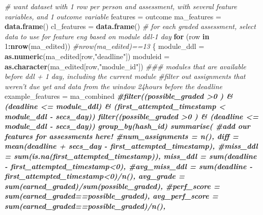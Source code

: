 \documentclass[
]{article}
\newenvironment{Shaded}{\begin{snugshade}}{\end{snugshade}}
\newcommand{\CommentTok}[1]{\textcolor[rgb]{0.56,0.35,0.01}{\textit{#1}}}
\newcommand{\ControlFlowTok}[1]{\textcolor[rgb]{0.13,0.29,0.53}{\textbf{#1}}}
\newcommand{\DataTypeTok}[1]{\textcolor[rgb]{0.13,0.29,0.53}{#1}}
\newcommand{\DecValTok}[1]{\textcolor[rgb]{0.00,0.00,0.81}{#1}}
\newcommand{\KeywordTok}[1]{\textcolor[rgb]{0.13,0.29,0.53}{\textbf{#1}}}
\newcommand{\NormalTok}[1]{#1}
\newcommand{\OperatorTok}[1]{\textcolor[rgb]{0.81,0.36,0.00}{\textbf{#1}}}
\newcommand{\StringTok}[1]{\textcolor[rgb]{0.31,0.60,0.02}{#1}}
\begin{document}
\begin{Shaded}
\begin{Highlighting}[]
\CommentTok{# want dataset with 1 row per person and assessment, with several feature variables, and 1 outcome variable}
\NormalTok{features =}\StringTok{ }\NormalTok{outcome}
\NormalTok{ma_features =}\StringTok{ }\KeywordTok{data.frame}\NormalTok{()}
\NormalTok{cl_features =}\StringTok{ }\KeywordTok{data.frame}\NormalTok{()}
\CommentTok{# for each graded assessment, select data to use for feature eng based on module ddl-1 day}
\ControlFlowTok{for}\NormalTok{ (row }\ControlFlowTok{in} \DecValTok{1}\OperatorTok{:}\KeywordTok{nrow}\NormalTok{(ma_edited)) }\CommentTok{#nrow(ma_edited)==13}
\NormalTok{\{}
\NormalTok{  module_ddl =}\StringTok{ }\KeywordTok{as.numeric}\NormalTok{(ma_edited[row,}\StringTok{"deadline"}\NormalTok{])}
\NormalTok{  moduleid =}\StringTok{ }\KeywordTok{as.character}\NormalTok{(ma_edited[row,}\StringTok{"module_id"}\NormalTok{])}
  \CommentTok{### modules that are available before ddl + 1 day, including the current module}
  \CommentTok{#filter out assignments that weren't due yet and data from the window 24hours before the deadline}
\NormalTok{  example_features =}\StringTok{ }\NormalTok{ma_combined }\OperatorTok{%>%}\StringTok{ }
\StringTok{    }\CommentTok{#filter((possible_graded >0 ) & (deadline <= module_ddl) & (first_attempted_timestamp < module_ddl - secs_day)) %>%}
\StringTok{    }\KeywordTok{filter}\NormalTok{((possible_graded }\OperatorTok{>}\DecValTok{0}\NormalTok{ ) }\OperatorTok{&}\StringTok{ }\NormalTok{(deadline }\OperatorTok{<=}\StringTok{ }\NormalTok{module_ddl }\OperatorTok{-}\StringTok{ }\NormalTok{secs_day)) }\OperatorTok{%>%}
\StringTok{    }\KeywordTok{group_by}\NormalTok{(hash_id) }\OperatorTok{%>%}
\StringTok{    }\KeywordTok{summarise}\NormalTok{(}
        \CommentTok{#add our features for assessments here!}
        \CommentTok{#num_assignments = n(),}
        \DataTypeTok{diff =} \KeywordTok{mean}\NormalTok{(deadline }\OperatorTok{+}\StringTok{ }\NormalTok{secs_day }\OperatorTok{-}\StringTok{ }\NormalTok{first_attempted_timestamp),}
        \CommentTok{#miss_ddl = sum(is.na(first_attempted_timestamp)),}
        \DataTypeTok{miss_ddl =} \KeywordTok{sum}\NormalTok{(deadline }\OperatorTok{-}\StringTok{ }\NormalTok{first_attempted_timestamp}\OperatorTok{<}\DecValTok{0}\NormalTok{),}
        \CommentTok{#avg_miss_ddl = sum(deadline - first_attempted_timestamp<0)/n(),}
        \DataTypeTok{avg_grade =} \KeywordTok{sum}\NormalTok{(earned_graded)}\OperatorTok{/}\KeywordTok{sum}\NormalTok{(possible_graded),}
        \CommentTok{#perf_score = sum(earned_graded==possible_graded),}
        \DataTypeTok{avg_perf_score =} \KeywordTok{sum}\NormalTok{(earned_graded}\OperatorTok{==}\NormalTok{possible_graded)}\OperatorTok{/}\KeywordTok{n}\NormalTok{(),}
}}}}
\end{Highlighting}
\end{Shaded}
\end{document}
